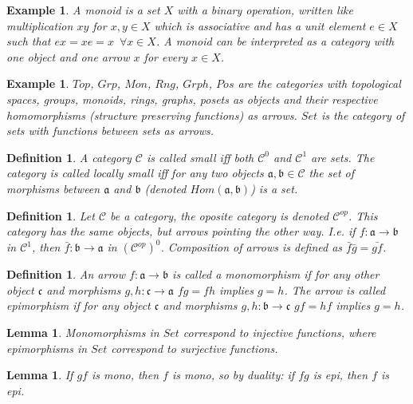 \documentclass{article}
\newcommand{\cat}[1]{\mathcal{#1}} %
\newcommand{\cato}[1]{\cat{#1}^0} %
\newcommand{\catm}[1]{\cat{#1}^1} %
\newcommand{\ob}[1]{\mathfrak{#1}} %
\newcommand{\catop}[1]{\cat{#1}^{op}}
\newcommand{\catopo}[1]{(\catop{#1})^0}
\newcommand{\all}{\enspace \forall}
\newcommand{\allin}[2]{\all #1 \in #2}
\newtheorem{lemma}[theorem]{Lemma}
\newtheorem{definition}[theorem]{Definition}
\newtheorem{example}[theorem]{Example}
\begin{document}
\begin{example}
	A \emph{monoid} is a set $X$ with a binary operation, written like multiplication $xy$ for $x,y \in X$ which is associative and has a unit element $e \in X$ such that $ex = xe = x \allin{x}{X}$.
	A monoid can be interpreted as a category with one object and one arrow $x$ for every $x \in X$.
\end{example}

\begin{example}
	$Top$, $Grp$, $Mon$, $Rng$, $Grph$, $Pos$ are the categories with \emph{topological spaces, groups, monoids, rings, graphs, posets} as objects and their respective homomorphisms (structure preserving functions) as arrows.
	$Set$ is the category of sets with functions between sets as arrows.
\end{example}

\begin{definition}
	A category $\cat{C}$ is called \emph{small} iff both $\cato{C}$ and $\catm{C}$ are sets. The category is called \emph{locally small} iff for any two objects $\ob{a},\ob{b} \in \cat{C}$ the set of morphisms between $\ob{a}$ and $\ob{b}$ (denoted $Hom(\ob{a},\ob{b})$) is a set.
\end{definition}

\begin{definition}
	Let $\cat{C}$ be a category, the \emph{oposite category} is denoted $\catop{C}$. This category has the same objects, but arrows pointing the other way. I.e. if $f: \ob{a} \rightarrow \ob{b}$ in $\catm{C}$, then $\bar{f}: \ob{b} \rightarrow \ob{a}$ in $\catopo{C}$. Composition of arrows is defined as $\bar{f}\bar{g} = \bar{gf}$.
\end{definition}

\begin{definition}
	An arrow $f: \ob{a} \rightarrow \ob{b}$ is called a \emph{monomorphism} if for any other object $\ob{c}$ and morphisms $g,h: \ob{c} \rightarrow \ob{a}$ $fg = fh$ implies $g=h$.
	The arrow is called \emph{epimorphism} if for any object $\ob{c}$ and morphisms $g,h: \ob{b} \rightarrow \ob{c}$ $gf = hf$ implies $g=h$.
\end{definition}

\begin{lemma}
	Monomorphisms in $Set$ correspond to injective functions, where epimorphisms in $Set$ correspond to surjective functions.
\end{lemma}
	
\begin{lemma}
	If $gf$ is mono, then $f$ is mono, so by duality: if $fg$ is epi, then $f$ is epi.
\end{lemma}
\end{document}
